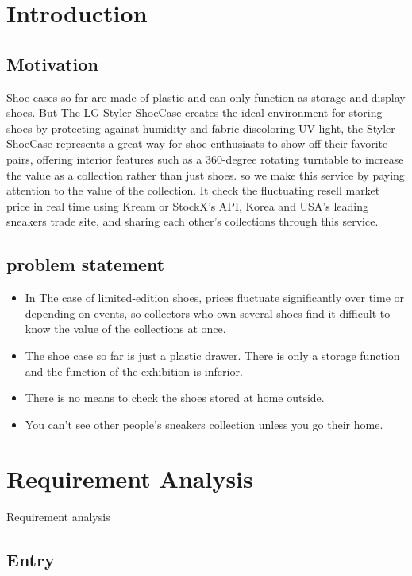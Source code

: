 \documentclass[conference]{IEEEtran}
\begin{document}
\section{Introduction}
\subsection{Motivation}
Shoe cases so far are made of plastic and can only function as storage and display shoes. But The LG Styler ShoeCase creates the ideal environment for storing shoes by protecting against humidity and fabric-discoloring UV light, the Styler ShoeCase represents a great way for shoe enthusiasts to show-off their favorite pairs, offering interior features such as a 360-degree rotating turntable to increase the value as a collection rather than just shoes. 
so we make this service by paying attention to the value of the collection. It check the fluctuating resell market price in real time using Kream or StockX's API, Korea and USA's leading sneakers trade site, and sharing each other's collections through this service.


\subsection{problem statement}
\begin{itemize}
\item In The case of limited-edition shoes, prices fluctuate significantly over time or depending on events, so collectors who own several shoes find it difficult to know the value of the collections at once.
\item The shoe case so far is just a plastic drawer. There is only a storage function and the function of the exhibition is inferior.
\item There is no means to check the shoes stored at home outside.
\item You can't see other people's sneakers collection unless you go their home.
\end{itemize}

\section{Requirement Analysis}

{Requirement analysis}

\subsection{Entry}
\end{document}
